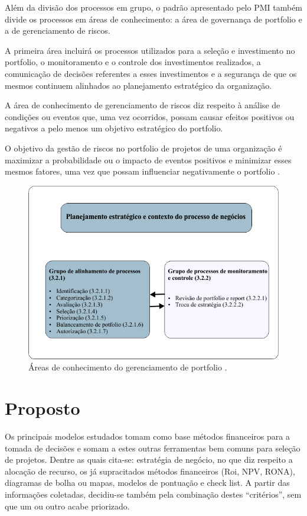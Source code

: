\documentclass[12pt,a4paper,ruledheader,tocpage=prefix,floatnumber=continuous,pagestart=folhaderosto,font=times]{abnt}
\begin{document}
Além da divisão dos processos em grupo, o padrão apresentado pelo PMI também divide os processos em áreas de conhecimento: a área de governança de 
portfolio e a de gerenciamento de riscos.

A primeira área incluirá os processos utilizados para a seleção e investimento no portfolio, o monitoramento e o controle dos investimentos realizados, 
a comunicação de decisões referentes a esses investimentos e a segurança de que os mesmos continuem alinhados ao planejamento estratégico da organização.

A área de conhecimento de gerenciamento de riscos diz respeito à análise de condições ou eventos que, uma vez ocorridos, possam causar efeitos positivos 
ou negativos a pelo menos um objetivo estratégico do portfolio. 

O objetivo da gestão de riscos no portfolio de projetos de uma organização é maximizar a probabilidade ou o impacto de eventos positivos e minimizar 
esses mesmos fatores, uma vez que possam influenciar negativamente o portfolio \cite{SPPM2008}.

\begin{figure}[H]
\centering
\includegraphics[width=.7\textwidth]{img/fig12.png}
\caption{Áreas de conhecimento do gerenciamento de portfolio \cite{SPPM2008}.}
\end{figure}

\section{Proposto}
Os principais modelos estudados tomam como base métodos financeiros para a tomada de decisões e somam a estes outras ferramentas bem comuns para seleção 
de projetos. Dentre as quais cita-se: estratégia de negócio, no que diz respeito a alocação de recurso, os já supracitados métodos financeiros (Roi, NPV,
RONA), diagramas de bolha ou mapas, modelos de pontuação e check list. A partir das informações coletadas, decidiu-se também pela combinação destes 
``critérios'', sem que um ou outro acabe priorizado.
\end{document}
